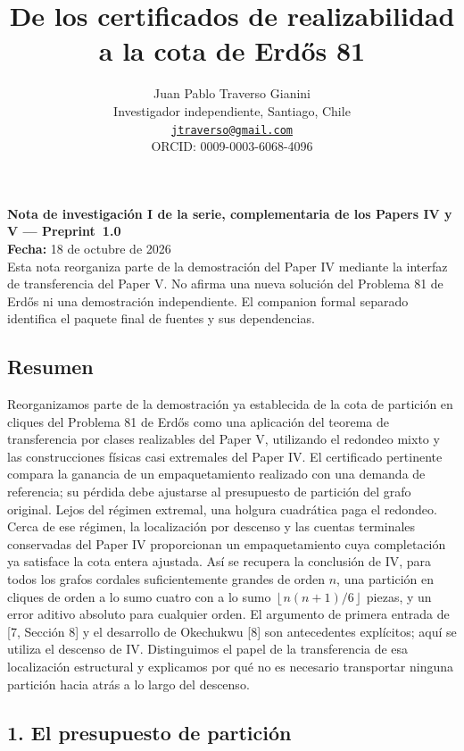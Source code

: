 \documentclass[spanish,11pt,a4paper]{article}
\title{De los certificados de realizabilidad a la cota de Erdős 81}
\author{Juan Pablo Traverso Gianini\\
Investigador independiente, Santiago, Chile\\
\href{mailto:jtraverso@gmail.com}{\nolinkurl{jtraverso@gmail.com}}\\
ORCID: 0009-0003-6068-4096}
\date{}
\begin{document}
\raggedbottom\maketitle
\textbf{Nota de investigación I de la serie, complementaria de los
Papers IV y V --- \mbox{Preprint 1.0}}\\
\textbf{Fecha:} 18 de octubre de 2026\\
Esta nota reorganiza parte de la demostración del Paper IV mediante la
interfaz de transferencia del Paper V. No afirma una nueva solución del
Problema 81 de Erdős ni una demostración independiente. El companion
formal separado identifica el paquete final de fuentes y sus
dependencias.

\subsection{Resumen}\label{resumen}

Reorganizamos parte de la demostración ya establecida de la cota de
partición en cliques del Problema 81 de Erdős como una aplicación del
teorema de transferencia por clases realizables del Paper V, utilizando
el redondeo mixto y las construcciones físicas casi extremales del Paper
IV. El certificado pertinente compara la ganancia de un empaquetamiento
realizado con una demanda de referencia; su pérdida debe ajustarse al
presupuesto de partición del grafo original. Lejos del régimen extremal,
una holgura cuadrática paga el redondeo. Cerca de ese régimen, la
localización por descenso y las cuentas terminales conservadas del Paper
IV proporcionan un empaquetamiento cuya completación ya satisface la
cota entera ajustada. Así se recupera la conclusión de IV, para todos
los grafos cordales suficientemente grandes de orden \(n\), una
partición en cliques de orden a lo sumo cuatro con a lo sumo
\(\left\lfloor n(n+1)/6\right\rfloor\) piezas, y un error aditivo
absoluto para cualquier orden. El argumento de primera entrada de {[}7,
Sección 8{]} y el desarrollo de Okechukwu {[}8{]} son antecedentes
explícitos; aquí se utiliza el descenso de IV. Distinguimos el papel de
la transferencia de esa localización estructural y explicamos por qué no
es necesario transportar ninguna partición hacia atrás a lo largo del
descenso.

\subsection{1. El presupuesto de
partición}\label{el-presupuesto-de-particiuxf3n}
\end{document}
